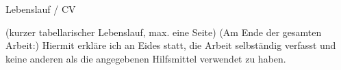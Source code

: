 \documentclass[a4paper,12pt]{article}
\begin{document}
\newpage
\listoftables
{} 

\lstlistoflistings

\newpage




\newpage 
Lebenslauf / CV





(kurzer tabellarischer Lebenslauf, max. eine Seite)
(Am Ende der gesamten Arbeit:)
Hiermit erkläre ich an Eides statt, die Arbeit selbständig verfasst und keine anderen
als die angegebenen Hilfsmittel verwendet zu haben.


\end{document}
